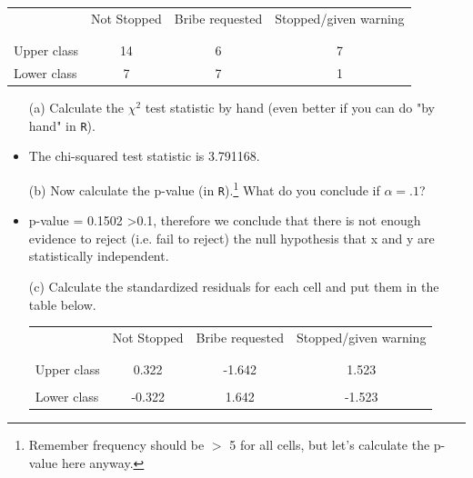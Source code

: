 \documentclass[12pt,letterpaper]{article}
\begin{document}
\begin{table}[h!]
	\centering
	\begin{tabular}{l | c c c }
		& Not Stopped & Bribe requested & Stopped/given warning \\
		\\[-1.8ex] 
		\hline \\[-1.8ex]
		Upper class & 14 & 6 & 7 \\
		Lower class & 7 & 7 & 1 \\
		\hline
	\end{tabular}
\end{table}

\begin{itemize}
	
	\item [(a)]
	Calculate the $\chi^2$ test statistic by hand (even better if you can do "by hand" in \texttt{R}).\\
	\vspace{1cm}
	\item
		The chi-squared test statistic is 3.791168.
	
	\vspace{1cm}
	\item [(b)]	Now calculate the p-value (in \texttt{R}).\footnote{Remember frequency should be $>$ 5 for all cells, but let's calculate the p-value here anyway.}  What do you conclude if $\alpha = .1$?\\
	\item
		p-value = 0.1502 \textgreater 0.1, therefore we conclude that there is not enough evidence to reject (i.e. fail to reject) the null hypothesis that x and y are statistically independent.
		
		\newpage
	\item [(c)] Calculate the standardized residuals for each cell and put them in the table below.
	\vspace{1cm}
	\begin{table}[h]
		\centering
		\begin{tabular}{l | c c c }
			& Not Stopped & Bribe requested & Stopped/given warning \\
			\\[-1.8ex] 
			\hline \\[-1.8ex]
			Upper class  &0.322  &-1.642  &1.523  \\ 
			\\ 
			Lower class &-0.322  &1.642   &-1.523  \\
		

\end{tabular}
\end{table}
\end{itemize}
\end{document}
